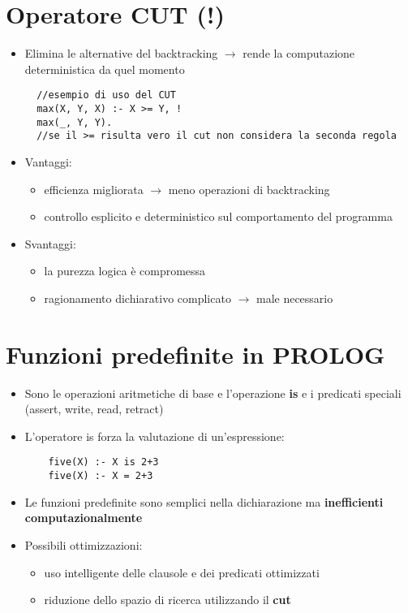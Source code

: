 \documentclass[12pt]{extarticle}
\begin{document}
\section*{Operatore CUT (!)}
\begin{itemize}
  \item Elimina le alternative del backtracking $\rightarrow$ rende la computazione deterministica da quel momento
  \begin{lstlisting}
  //esempio di uso del CUT
  max(X, Y, X) :- X >= Y, !
  max(_, Y, Y).
  //se il >= risulta vero il cut non considera la seconda regola
  \end{lstlisting}
  \item Vantaggi:
  \begin{itemize}
    \item efficienza migliorata $\rightarrow$ meno operazioni di backtracking
    \item controllo esplicito e deterministico sul comportamento del programma
  \end{itemize}
  \item Svantaggi:
  \begin{itemize}
    \item la purezza logica è compromessa
    \item ragionamento dichiarativo complicato $\rightarrow$ male necessario
  \end{itemize}
\end{itemize}

\section*{Funzioni predefinite in PROLOG}
\begin{itemize}
  \item Sono le operazioni aritmetiche di base e l'operazione \textbf{is} e i predicati speciali (assert, write, read, retract)
  \item L'operatore is forza la valutazione di un'espressione:
  \begin{lstlisting}
    five(X) :- X is 2+3
    five(X) :- X = 2+3
  \end{lstlisting}
  \item Le funzioni predefinite sono semplici nella dichiarazione ma \textbf{inefficienti computazionalmente}
  \item Possibili ottimizzazioni:
  \begin{itemize}
    \item uso intelligente delle clausole e dei predicati ottimizzati
    \item riduzione dello spazio di ricerca utilizzando il \textbf{cut}
  \end{itemize}
\end{itemize}
\end{document}
